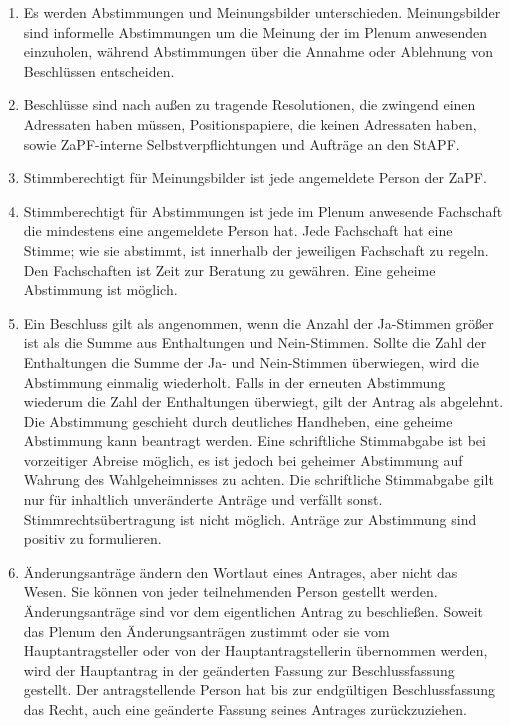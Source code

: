 \documentclass[draft,12pt,oneside]{scrreprt}
\begin{document}
\begin{enumerate}
  \item Es werden Abstimmungen und Meinungsbilder unterschieden. Meinungsbilder
        sind informelle Abstimmungen um die Meinung der im Plenum anwesenden
        einzuholen, während Abstimmungen über die Annahme oder Ablehnung von
        Beschlüssen entscheiden.

  \item Beschlüsse sind nach außen zu tragende Resolutionen, die zwingend einen
        Adressaten haben müssen, Positionspapiere, die keinen Adressaten haben,
        sowie ZaPF-interne Selbstverpflichtungen und Aufträge an den StAPF.

  \item Stimmberechtigt für Meinungsbilder ist jede angemeldete Person der ZaPF.

  \item Stimmberechtigt für Abstimmungen ist jede im Plenum anwesende Fachschaft
        die mindestens eine angemeldete Person hat.
        Jede Fachschaft hat eine Stimme; wie sie abstimmt, ist innerhalb der
        jeweiligen Fachschaft zu regeln.
        Den Fachschaften ist Zeit zur Beratung zu gewähren.
        Eine geheime Abstimmung ist möglich.

  \item Ein Beschluss gilt als angenommen, wenn die Anzahl der Ja-Stimmen größer
        ist als die Summe aus Enthaltungen und Nein-Stimmen.
        Sollte die Zahl der Enthaltungen die Summe der Ja- und Nein-Stimmen
        überwiegen, wird die Abstimmung einmalig wiederholt.
        Falls in der erneuten Abstimmung wiederum die Zahl der Enthaltungen
        überwiegt, gilt der Antrag als abgelehnt.
        Die Abstimmung geschieht durch deutliches Handheben, eine geheime
        Abstimmung kann beantragt werden.
        Eine schriftliche Stimmabgabe ist bei vorzeitiger Abreise möglich, es ist
        jedoch bei geheimer Abstimmung auf Wahrung des Wahlgeheimnisses zu achten.
        Die schriftliche Stimmabgabe gilt nur für inhaltlich unveränderte Anträge
        und verfällt sonst.
        Stimmrechtsübertragung ist nicht möglich.
        Anträge zur Abstimmung sind positiv zu formulieren.

  \item Änderungsanträge ändern den Wortlaut eines Antrages, aber nicht das Wesen.
        Sie können von jeder teilnehmenden Person gestellt werden.
        Änderungsanträge sind vor dem eigentlichen Antrag zu beschließen.
        Soweit das Plenum den Änderungsanträgen zustimmt oder sie vom
        Hauptantragsteller oder von der Hauptantragstellerin übernommen werden,
        wird der Hauptantrag in der geänderten Fassung zur Beschlussfassung gestellt.
        Der antragstellende Person hat bis zur endgültigen Beschlussfassung das Recht,
        auch eine geänderte Fassung seines Antrages zurückzuziehen.


\end{enumerate}
\end{document}
